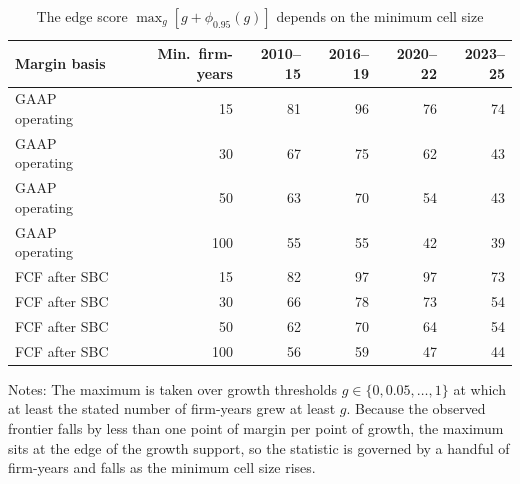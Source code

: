 \begin{table}[t]\centering\small
\caption{The edge score $\max_g[g+\phi_{0.95}(g)]$ depends on the minimum cell size}\label{tab:edge}
\begin{tabular}{lrrrrr}\toprule
Margin basis & Min.\ firm-years & 2010--15 & 2016--19 & 2020--22 & 2023--25\\\midrule
GAAP operating & 15 & 81 & 96 & 76 & 74 \\
GAAP operating & 30 & 67 & 75 & 62 & 43 \\
GAAP operating & 50 & 63 & 70 & 54 & 43 \\
GAAP operating & 100 & 55 & 55 & 42 & 39 \\
\addlinespace
FCF after SBC & 15 & 82 & 97 & 97 & 73 \\
FCF after SBC & 30 & 66 & 78 & 73 & 54 \\
FCF after SBC & 50 & 62 & 70 & 64 & 54 \\
FCF after SBC & 100 & 56 & 59 & 47 & 44 \\
\bottomrule\end{tabular}
\par\vspace{2pt}\footnotesize\raggedright Notes: The maximum is taken over growth thresholds $g\in\{0,0.05,\dots,1\}$ at which at least the stated number of firm-years grew at least $g$. Because the observed frontier falls by less than one point of margin per point of growth, the maximum sits at the edge of the growth support, so the statistic is governed by a handful of firm-years and falls as the minimum cell size rises.
\end{table}